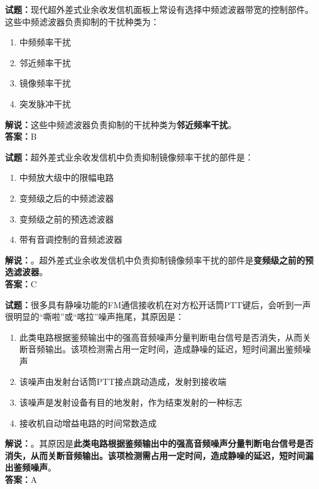 \documentclass{ctexbook}
\begin{document}
\bigskip


\noindent\textbf{试题：}现代超外差式业余收发信机面板上常设有选择中频滤波器带宽的控制部件。这些中频滤波器负责抑制的干扰种类为：
\begin{enumerate}[leftmargin=3em]
\item 中频频率干扰
\item 邻近频率干扰
\item 镜像频率干扰
\item 突发脉冲干扰
\end{enumerate}
\noindent\textbf{解说：}这些中频滤波器负责抑制的干扰种类为\textbf{邻近频率干扰}。\\\noindent\textbf{答案：}B




\bigskip


\noindent\textbf{试题：}超外差式业余收发信机中负责抑制镜像频率干扰的部件是：
\begin{enumerate}[leftmargin=3em]
\item 中频放大级中的限幅电路
\item 变频级之后的中频滤波器
\item 变频级之前的预选滤波器
\item 带有音调控制的音频滤波器
\end{enumerate}
\noindent\textbf{解说：}。超外差式业余收发信机中负责抑制镜像频率干扰的部件是\textbf{变频级之前的预选滤波器}。\\\noindent\textbf{答案：}C



\bigskip


\noindent\textbf{试题：}很多具有静噪功能的FM通信接收机在对方松开话筒PTT键后，会听到一声很明显的“嘶啦”或“喀拉”噪声拖尾，其原因是：
\begin{enumerate}[leftmargin=3em]
\item 此类电路根据鉴频输出中的强高音频噪声分量判断电台信号是否消失，从而关断音频输出。该项检测需占用一定时间，造成静噪的延迟，短时间漏出鉴频噪声
\item 该噪声由发射台话筒PTT接点跳动造成，发射到接收端
\item 该噪声是发射设备有目的地发射，作为结束发射的一种标志
\item 接收机自动增益电路的时间常数造成
\end{enumerate}
\noindent\textbf{解说：}。其原因是\textbf{此类电路根据鉴频输出中的强高音频噪声分量判断电台信号是否消失，从而关断音频输出。该项检测需占用一定时间，造成静噪的延迟，短时间漏出鉴频噪声}。\\\noindent\textbf{答案：}A
\end{document}
